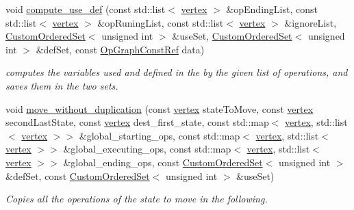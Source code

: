 \begin{DoxyCompactItemize}
void \hyperlink{classBB__based__stg_af5a6daf4d51de5aa9b2aa18eba16c5d1}{compute\+\_\+use\+\_\+def} (const std\+::list$<$ \hyperlink{graph_8hpp_abefdcf0544e601805af44eca032cca14}{vertex} $>$ \&op\+Ending\+List, const std\+::list$<$ \hyperlink{graph_8hpp_abefdcf0544e601805af44eca032cca14}{vertex} $>$ \&op\+Runing\+List, const std\+::list$<$ \hyperlink{graph_8hpp_abefdcf0544e601805af44eca032cca14}{vertex} $>$ \&ignore\+List, \hyperlink{classCustomOrderedSet}{Custom\+Ordered\+Set}$<$ unsigned int $>$ \&use\+Set, \hyperlink{classCustomOrderedSet}{Custom\+Ordered\+Set}$<$ unsigned int $>$ \&def\+Set, const \hyperlink{op__graph_8hpp_a9a0b240622c47584bee6951a6f5de746}{Op\+Graph\+Const\+Ref} data)
\begin{DoxyCompactList}\small\item\em computes the variables used and defined in the by the given list of operations, and saves them in the two sets. \end{DoxyCompactList}\item 
void \hyperlink{classBB__based__stg_aecadba799040dd72068eb6805f7f53e2}{move\+\_\+without\+\_\+duplication} (const \hyperlink{graph_8hpp_abefdcf0544e601805af44eca032cca14}{vertex} state\+To\+Move, const \hyperlink{graph_8hpp_abefdcf0544e601805af44eca032cca14}{vertex} second\+Last\+State, const \hyperlink{graph_8hpp_abefdcf0544e601805af44eca032cca14}{vertex} dest\+\_\+first\+\_\+state, const std\+::map$<$ \hyperlink{graph_8hpp_abefdcf0544e601805af44eca032cca14}{vertex}, std\+::list$<$ \hyperlink{graph_8hpp_abefdcf0544e601805af44eca032cca14}{vertex} $>$$>$ \&global\+\_\+starting\+\_\+ops, const std\+::map$<$ \hyperlink{graph_8hpp_abefdcf0544e601805af44eca032cca14}{vertex}, std\+::list$<$ \hyperlink{graph_8hpp_abefdcf0544e601805af44eca032cca14}{vertex} $>$$>$ \&global\+\_\+executing\+\_\+ops, const std\+::map$<$ \hyperlink{graph_8hpp_abefdcf0544e601805af44eca032cca14}{vertex}, std\+::list$<$ \hyperlink{graph_8hpp_abefdcf0544e601805af44eca032cca14}{vertex} $>$$>$ \&global\+\_\+ending\+\_\+ops, const \hyperlink{classCustomOrderedSet}{Custom\+Ordered\+Set}$<$ unsigned int $>$ \&def\+Set, const \hyperlink{classCustomOrderedSet}{Custom\+Ordered\+Set}$<$ unsigned int $>$ \&use\+Set)
\begin{DoxyCompactList}\small\item\em Copies all the operations of the state to move in the following. \end{DoxyCompactList}\item 
$$
\end{DoxyCompactItemize}
